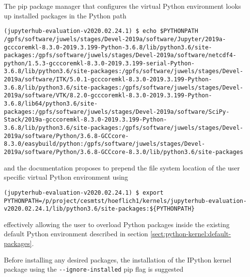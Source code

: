 \documentclass[11pt,a4paper]{article}
\begin{document}
The pip package manager that configures the virtual Python environment looks up installed packages in the Python path

\begin{verbatim}
(jupyterhub-evaluation-v2020.02.24.1) $ echo $PYTHONPATH
/gpfs/software/juwels/stages/Devel-2019a/software/Jupyter/2019a-gcccoremkl-8.3.0-2019.3.199-Python-3.6.8/lib/python3.6/site-packages:/gpfs/software/juwels/stages/Devel-2019a/software/netcdf4-python/1.5.3-gcccoremkl-8.3.0-2019.3.199-serial-Python-3.6.8/lib/python3.6/site-packages:/gpfs/software/juwels/stages/Devel-2019a/software/ITK/5.0.1-gcccoremkl-8.3.0-2019.3.199-Python-3.6.8/lib/python3.6/site-packages:/gpfs/software/juwels/stages/Devel-2019a/software/VTK/8.2.0-gcccoremkl-8.3.0-2019.3.199-Python-3.6.8/lib64/python3.6/site-packages:/gpfs/software/juwels/stages/Devel-2019a/software/SciPy-Stack/2019a-gcccoremkl-8.3.0-2019.3.199-Python-3.6.8/lib/python3.6/site-packages:/gpfs/software/juwels/stages/Devel-2019a/software/Python/3.6.8-GCCcore-8.3.0/easybuild/python:/gpfs/software/juwels/stages/Devel-2019a/software/Python/3.6.8-GCCcore-8.3.0/lib/python3.6/site-packages
\end{verbatim}

and the documentation proposes to prepend the file system location of the user specific virtual Python environment using

\begin{verbatim}
(jupyterhub-evaluation-v2020.02.24.1) $ export PYTHONPATH=/p/project/cesmtst/hoeflich1/kernels/jupyterhub-evaluation-v2020.02.24.1/lib/python3.6/site-packages:${PYTHONPATH}
\end{verbatim}

effectively allowing the user to overload Python packages inside the existing default Python environment described in section \ref{sect:python-kernel:default-packages}.

Before installing any desired packages, the installation of the IPython kernel package using the \verb|--ignore-installed| pip flag is suggested
\end{document}
